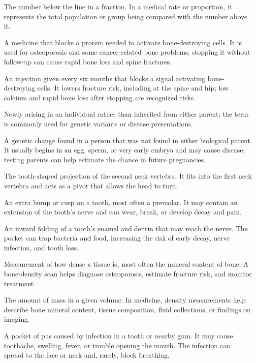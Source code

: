  The number below the line in a fraction. In a medical rate or proportion, it represents the total population or group being compared with the number above it.

 A medicine that blocks a protein needed to activate bone-destroying cells. It is used for osteoporosis and some cancer-related bone problems; stopping it without follow-up can cause rapid bone loss and spine fractures.

 An injection given every six months that blocks a signal activating bone-destroying cells. It lowers fracture risk, including at the spine and hip; low calcium and rapid bone loss after stopping are recognized risks.

 Newly arising in an individual rather than inherited from either parent; the term is commonly used for genetic variants or disease presentations.

 A genetic change found in a person that was not found in either biological parent. It usually begins in an egg, sperm, or very early embryo and may cause disease; testing parents can help estimate the chance in future pregnancies.

 The tooth-shaped projection of the second neck vertebra. It fits into the first neck vertebra and acts as a pivot that allows the head to turn.

 An extra bump or cusp on a tooth, most often a premolar. It may contain an extension of the tooth’s nerve and can wear, break, or develop decay and pain.

 An inward folding of a tooth’s enamel and dentin that may reach the nerve. The pocket can trap bacteria and food, increasing the risk of early decay, nerve infection, and tooth loss.

 Measurement of how dense a tissue is, most often the mineral content of bone. A bone-density scan helps diagnose osteoporosis, estimate fracture risk, and monitor treatment.

 The amount of mass in a given volume. In medicine, density measurements help describe bone mineral content, tissue composition, fluid collections, or findings on imaging.

 A pocket of pus caused by infection in a tooth or nearby gum. It may cause toothache, swelling, fever, or trouble opening the mouth. The infection can spread to the face or neck and, rarely, block breathing.

